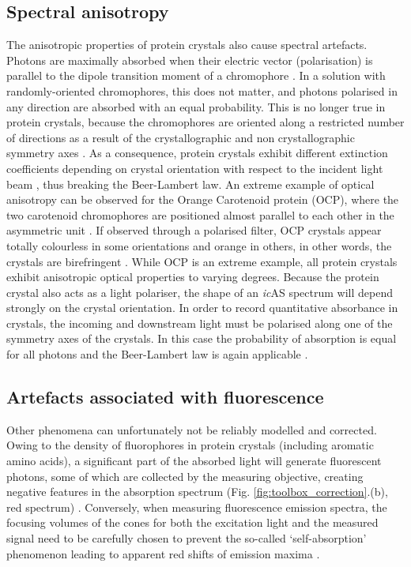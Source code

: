 \subsection{Spectral anisotropy}

The anisotropic properties of protein crystals also cause spectral artefacts. Photons are maximally absorbed when their electric vector (polarisation) is parallel to the dipole transition moment of a chromophore \parencite{eaton16PolarizedAbsorption1981}. In a solution with randomly-oriented chromophores, this does not matter, and photons polarised in any direction are absorbed with an equal probability. This is no longer true in protein crystals, because the chromophores are oriented along a restricted number of directions as a result of the crystallographic and non crystallographic symmetry axes \parencite{eatonSingleCrystalSpectra1968}. As a consequence, protein crystals exhibit different extinction coefficients depending on crystal orientation with respect to the incident light beam \parencite{eatonSingleCrystalSpectra1968}, thus breaking the Beer-Lambert law. An extreme example of optical anisotropy can be observed for the Orange Carotenoid protein (OCP), where the two carotenoid chromophores are positioned almost parallel to each other in the asymmetric unit \parencite{kerfeldCrystalStructureCyanobacterial2003}. If observed through a polarised filter, OCP crystals appear totally colourless in some orientations and orange in others, in other words, the crystals are birefringent \parencite{kerfeldCrystalsCarotenoidProtein1997}. While OCP is an extreme example, all protein crystals exhibit anisotropic optical properties to varying degrees. Because the protein crystal also acts as a light polariser, the shape of an \textit{ic}AS spectrum will depend strongly on the crystal orientation. In order to record quantitative absorbance in crystals, the incoming and downstream light must be polarised along one of the symmetry axes of the crystals. In this case the probability of absorption is equal for all photons and the Beer-Lambert law is again applicable \parencite{mozzarelliProteinFunctionCrystal1996}. 

\subsection{Artefacts associated with fluorescence}
Other phenomena can unfortunately not be reliably modelled and corrected. Owing to the density of fluorophores in protein crystals (including aromatic amino acids), a significant part of the absorbed light will generate fluorescent photons, some of which are collected by the measuring objective, creating negative features in the absorption spectrum (Fig. \ref{fig:toolbox_correction}.(b), red spectrum) \parencite{vonstettenCrystalloOpticalSpectroscopy2015}. Conversely, when measuring fluorescence emission spectra, the focusing volumes of the cones for both the excitation light and the measured signal need to be carefully chosen to prevent the so-called ‘self-absorption’ phenomenon leading to apparent red shifts of emission maxima \parencite{barrosCrystalStructurePlant2009,vonstettenCrystalloOpticalSpectroscopy2015}. 

